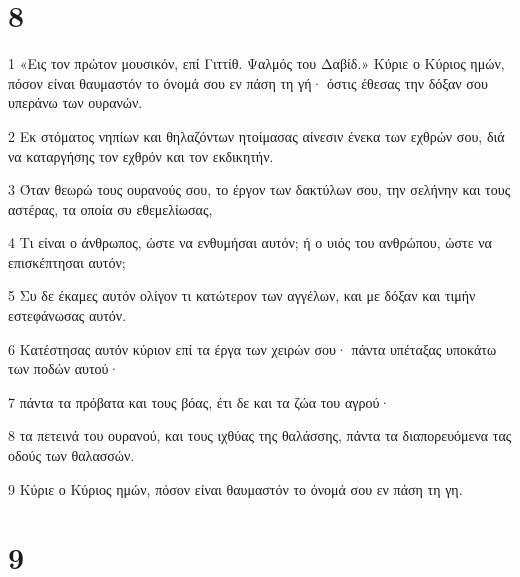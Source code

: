\chapter{8}

\par 1 «Εις τον πρώτον μουσικόν, επί Γιττίθ. Ψαλμός του Δαβίδ.» Κύριε ο Κύριος ημών, πόσον είναι θαυμαστόν το όνομά σου εν πάση τη γή· όστις έθεσας την δόξαν σου υπεράνω των ουρανών.
\par 2 Εκ στόματος νηπίων και θηλαζόντων ητοίμασας αίνεσιν ένεκα των εχθρών σου, διά να καταργήσης τον εχθρόν και τον εκδικητήν.
\par 3 Όταν θεωρώ τους ουρανούς σου, το έργον των δακτύλων σου, την σελήνην και τους αστέρας, τα οποία συ εθεμελίωσας,
\par 4 Τι είναι ο άνθρωπος, ώστε να ενθυμήσαι αυτόν; ή ο υιός του ανθρώπου, ώστε να επισκέπτησαι αυτόν;
\par 5 Συ δε έκαμες αυτόν ολίγον τι κατώτερον των αγγέλων, και με δόξαν και τιμήν εστεφάνωσας αυτόν.
\par 6 Κατέστησας αυτόν κύριον επί τα έργα των χειρών σου· πάντα υπέταξας υποκάτω των ποδών αυτού·
\par 7 πάντα τα πρόβατα και τους βόας, έτι δε και τα ζώα του αγρού·
\par 8 τα πετεινά του ουρανού, και τους ιχθύας της θαλάσσης, πάντα τα διαπορευόμενα τας οδούς των θαλασσών.
\par 9 Κύριε ο Κύριος ημών, πόσον είναι θαυμαστόν το όνομά σου εν πάση τη γη.

\chapter{9}

